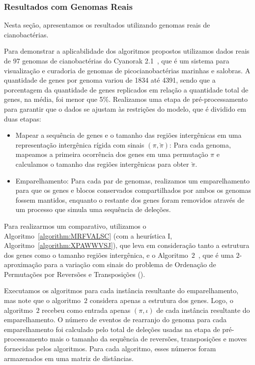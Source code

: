 \subsubsection{Resultados com Genomas Reais}

Nesta seção, apresentamos os resultados utilizando genomas reais de cianobactérias.

Para demonstrar a aplicabilidade dos algoritmos propostos utilizamos dados reais de 97 genomas de cianobactérias do Cyanorak 2.1~\cite{cyanorak}, que é um sistema para visualização e curadoria de genomas de picocianobactérias marinhas e salobras. A quantidade de genes por genoma variou de 1834 até 4391, sendo que a porcentagem da quantidade de genes replicados em relação a quantidade total de genes, na média, foi menor que 5\%. Realizamos uma etapa de pré-processamento para garantir que o dados se ajustam às restrições do modelo, que é dividido em duas etapas:
\begin{itemize}
  \item Mapear a sequência de genes e o tamanho das regiões intergênicas em uma representação intergênica rígida com sinais $(\pi,\breve\pi)$: Para cada genoma, mapeamos a primeira ocorrência dos genes em uma permutação $\pi$ e calculamos o tamanho das regiões intergênicas para obter $\breve\pi$.
  \item Emparelhamento: Para cada par de genomas, realizamos um emparelhamento para que os genes e blocos conservados compartilhados por ambos os genomas fossem mantidos, enquanto o restante dos genes foram removidos através de um processo que simula uma sequência de deleções.
\end{itemize}

Para realizarmos um comparativo, utilizamos o Algoritmo~\ref{algorithm:MRFVALSC} (com a heurística I, Algoritmo~\ref{algorithm:XPAWWVSJ}), que leva em consideração tanto a estrutura dos genes como o tamanho regiões intergênica, e o Algoritmo~$2$\SbRT{}~\cite{1998-walter-etal}, que é uma $2$-aproximação para a variação com sinais do problema de Ordenação de Permutações por Reversões e Transposições (\SbRT).

Executamos os algoritmos para cada instância resultante do emparelhamento, mas note que o algoritmo~$2$\SbRT{} considera apenas a estrutura dos genes. Logo, o algoritmo~$2$\SbRT{} recebeu como entrada apenas $(\pi,\iota)$ de cada instância resultante do emparelhamento. O número de eventos de rearranjo do genoma para cada emparelhamento foi calculado pelo total de deleções usadas na etapa de pré-processamento mais o tamanho da sequência de reversões, transposições e moves fornecidas pelos algoritmos. Para cada algoritmo, esses números foram armazenados em uma matriz de distâncias.

